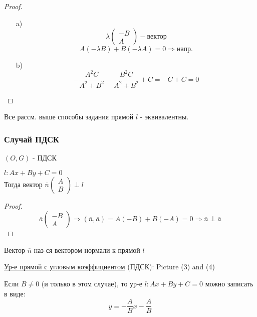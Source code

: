 \begin{proof}
  \begin{itemize}
    \item[a) ]
\[
\lambda\begin{pmatrix}-B \\ A \end{pmatrix} - \text{вектор}
\]
\[
A(-\lambda B) + B(-\lambda A) = 0 \Rightarrow \text{напр.}
\]
\item [b) ] \[
-\frac{A^{2}C}{A^{2} + B^{2}} - \frac{B^{2}C}{A^{2} + B^{2}} + C = -C + C = 0
\]
  \end{itemize}
\end{proof}
\begin{consequence}
  Все рассм. выше способы задания прямой $l$ - эквивалентны.
\end{consequence}
\subsubsection{Случай ПДСК}
$(O, G)$ - ПДСК
\begin{statement}
$l\colon Ax + By + C = 0$ \\
Тогда вектор $\overline{n}\begin{pmatrix} A \\ B \end{pmatrix} \perp l$
\end{statement}
\begin{proof}
\[
\overline{a}\begin{pmatrix}-B \\ A \end{pmatrix} \Rightarrow (\overline{n}, \overline{a}) = A(-B) + B(-A) = 0 \Rightarrow \overline{n} \perp \overline{a}
\]
\end{proof}
\begin{definition}
Вектор $\overline{n}$ наз-ся вектором нормали к прямой $l$
\end{definition}
\underline{Ур-е прямой с угловым коэффициентом} (ПДСК):
Picture (3) and (4)
\begin{note}
Если $B \neq 0$ (и только в этом случае), то ур-е $l\colon Ax + By + C = 0$ можно записать в виде:
\[
 y = -\frac{A}{B}x - \frac{A}{B}
\]
\end{note}

